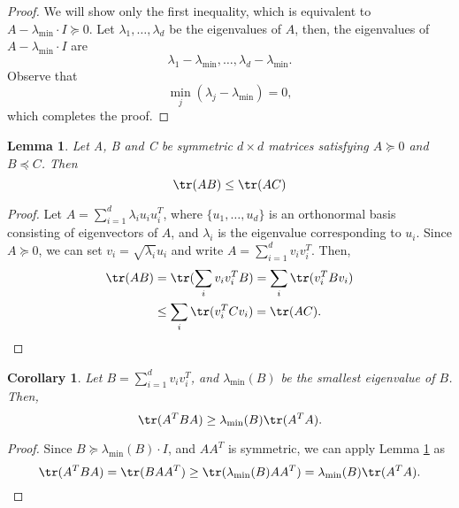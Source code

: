 \documentclass[nobib]{my-handout}
\newtheorem{lemma}{Lemma}
\newtheorem{corollary}{Corollary}
\begin{document}
\begin{proof}
	We will show only the first inequality, which is equivalent to $A -
	\lambda_{\min} \cdot I \succeq 0$. Let $\lambda_1, \dotsc, \lambda_d$ be the
	eigenvalues of $A$, then, the eigenvalues of $A - \lambda_{\min} \cdot I$ are
	\[ {\lambda_1 - \lambda_{\min}, \dotsc, \lambda_d - \lambda_{\min}}. \]
	Observe that
	\[ \min_j(\lambda_j - \lambda_{\min}) = 0, \]
	which completes the proof.
\end{proof}

\begin{lemma}\label{lemma:tr_AB_le_AC}
	Let A, B and C be symmetric $d \times d$ matrices satisfying $A \succeq 0$
	and $B \preceq C$. Then
	\[ \tr(AB) \le \tr(AC) \]
\end{lemma}

\begin{proof}
	Let $A = \sum_{i=1}^d \lambda_i u_i u_i^T$, where $\{u_1, \dotsc, u_d\}$ is an
	orthonormal basis consisting of eigenvectors of $A$, and $\lambda_i$ is the
	eigenvalue corresponding to $u_i$. Since $A \succeq 0$, we can set $v_i =
	\sqrt{\lambda_i} u_i$ and write $A = \sum_{i=1}^d v_i v_i^T$. Then,
	\begin{equation*}
		\begin{aligned}
			\tr(AB) &= \tr(\sum_i v_i v_i^T B) = \sum_i \tr(v_i^T B v_i) \\
							&\le \sum_i \tr(v_i^T C v_i) = \tr(AC).
		\end{aligned}
	\end{equation*}
\end{proof}

\begin{corollary}
	Let $B = \sum_{i=1}^d v_i v_i^T$, and $\lambda_{\min}(B)$ be the smallest
	eigenvalue of $B$. Then,
	\[ \tr(A^T B A) \ge \lambda_{\min}(B) \tr(A^T A). \]
\end{corollary}

\begin{proof}
	Since $B \succeq \lambda_{\min}(B) \cdot I$, and $A A^T$ is symmetric, we can
	apply Lemma \ref{lemma:tr_AB_le_AC} as
	\[ \tr(A^T B A) = \tr(B A A^T) \ge \tr(\lambda_{\min}(B) A A^T) =
	\lambda_{\min}(B) \tr(A^T A). \]
\end{proof}





\end{document}

